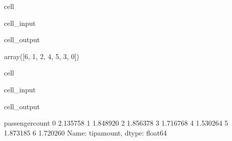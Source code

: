 \documentclass[letterpaper,10pt,english]{sphinxmanual}
\begin{document}
\begin{sphinxuseclass}{cell}
\begin{sphinxuseclass}{cell_input}
\begin{sphinxVerbatim}[commandchars=\\\{\}]
  \PYG{p}{[}\PYG{p}{]}
\end{sphinxVerbatim}

\end{sphinxuseclass}
\begin{sphinxuseclass}{cell_output}
\begin{sphinxVerbatim}[commandchars=\\\{\}]
array([6, 1, 2, 4, 5, 3, 0])
\end{sphinxVerbatim}

\end{sphinxuseclass}
\end{sphinxuseclass}
\begin{sphinxuseclass}{cell}
\begin{sphinxuseclass}{cell_input}
\begin{sphinxVerbatim}[commandchars=\\\{\}]
  \PYG{p}{[}\PYG{p}{]}
\end{sphinxVerbatim}

\end{sphinxuseclass}
\begin{sphinxuseclass}{cell_output}
\begin{sphinxVerbatim}[commandchars=\\\{\}]
passenger\PYGZus{}count
0    2.135758
1    1.848920
2    1.856378
3    1.716768
4    1.530264
5    1.873185
6    1.720260
Name: tip\PYGZus{}amount, dtype: float64
\end{sphinxVerbatim}

\end{sphinxuseclass}
\end{sphinxuseclass}
\end{document}
